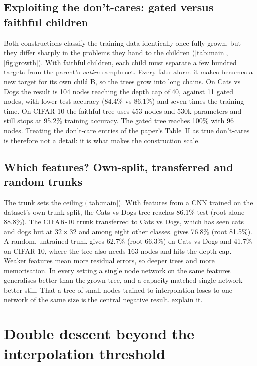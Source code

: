 \documentclass[10.5pt,a4paper]{article}
\begin{document}
\subsection{Exploiting the don't-cares: gated versus faithful children}

Both constructions classify the training data identically once fully grown, but they differ sharply in the
problems they hand to the children (\cref{tab:main}, \cref{fig:growth}). With faithful children, each child must
separate a few hundred targets from the parent's \emph{entire} sample set. Every false alarm it makes becomes a new
target for its own child B, so the trees grow into long chains. On Cats vs Dogs the result is 104 nodes reaching the
depth cap of 40, against 11 gated nodes, with lower test accuracy (84.4\% vs 86.1\%) and seven times the training
time. On CIFAR-10 the faithful tree uses 453 nodes and 530k parameters and still stops at 95.2\% training accuracy. The
gated tree reaches 100\% with 96 nodes. Treating the don't-care entries of the paper's Table~II as true don't-cares is
therefore not a detail: it is what makes the construction scale.

\subsection{Which features? Own-split, transferred and random trunks}

The trunk sets the ceiling (\cref{tab:main}). With features from a CNN trained on the dataset's own trunk split,
the Cats vs Dogs tree reaches 86.1\% test (root alone 88.8\%). The CIFAR-10 trunk transferred to Cats vs Dogs, which has
seen cats and dogs but at $32\times32$ and among eight other classes, gives 76.8\% (root 81.5\%). A random, untrained
trunk gives 62.7\% (root 66.3\%) on Cats vs Dogs and 41.7\% on CIFAR-10, where the tree also needs 163 nodes and hits the
depth cap. Weaker features mean more residual errors, so deeper trees and more memorisation. In every setting a single
node network on the same features generalises better than the grown tree, and a capacity-matched single network
better still. That a tree of small nodes trained to interpolation loses to one network of the same size is the central
negative result.  explain it.

\section{Double descent beyond the interpolation threshold}
\label{sec:dd}
\end{document}
